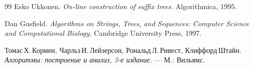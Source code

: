 \begin{thebibliography}{99}
Esko Ukkonen.
{\itshape On-line construction of suffix trees.} Algorithmica, 1995.

Dan Gusfield.
{\itshape Algorithms on Strings, Trees, and Sequences: Computer Science and Computational Biology.}
Cambridge University Press, 1997.

Томас\,Х.\,Кормен, Чарльз\,И.\,Лейзерсон, Рональд\,Л.\,Ривест, Клиффорд\,Штайн.
{\itshape Алгоритмы: построение и анализ, 3-е издание.} --- М.: Вильямс.

\end{thebibliography}
\pagebreak
